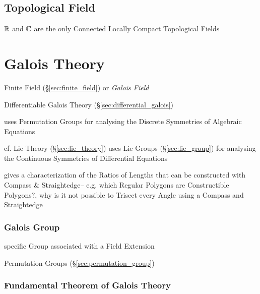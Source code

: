 \subsection{Topological Field}\label{sec:topological_field}

$\mathbb{R}$ and $\mathbb{C}$ are the only Connected Locally Compact
Topological Fields



\section{Galois Theory}\label{sec:galois_theory}

Finite Field (\S\ref{sec:finite_field}) or \emph{Galois Field}

Differentiable Galois Theory (\S\ref{sec:differential_galois})

uses Permutation Groups for analysing the Discrete Symmetries of
Algebraic Equations %

cf. Lie Theory (\S\ref{sec:lie_theory}) uses Lie Groups
(\S\ref{sec:lie_group}) for analysing the Continuous Symmetries of
Differential Equations

gives a characterization of the Ratios of Lengths that can be constructed with
Compass \& Straightedge-- e.g. which Regular Polygons are Constructible
Polygons?, why is it not possible to Trisect every Angle using a Compass and
Straightedge



\subsubsection{Galois Group}\label{sec:galois_group}

specific Group associated with a Field Extension %

Permutation Groups (\S\ref{sec:permutation_group})



\subsubsection{Fundamental Theorem of Galois Theory}
\label{sec:fundamental_galois_theorem}

